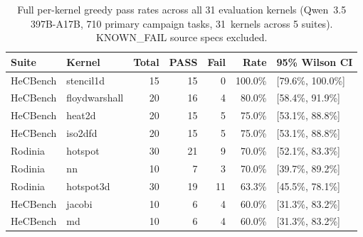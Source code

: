 \begin{table}[htbp]
\centering
\caption{Full per-kernel greedy pass rates across all 31 evaluation kernels (Qwen~3.5 397B-A17B, 710 primary campaign tasks, 31~kernels across 5 suites). KNOWN\_FAIL source specs excluded.}
\label{tab:per-kernel-full}
\footnotesize
\begin{tabular}{@{}llrrrrl@{}}
\toprule
Suite & Kernel & Total & PASS & Fail & Rate & 95\% Wilson CI \\
\midrule
HeCBench & stencil1d & 15 & 15 & 0 & 100.0\% & [79.6\%, 100.0\%] \\
HeCBench & floydwarshall & 20 & 16 & 4 & 80.0\% & [58.4\%, 91.9\%] \\
HeCBench & heat2d & 20 & 15 & 5 & 75.0\% & [53.1\%, 88.8\%] \\
HeCBench & iso2dfd & 20 & 15 & 5 & 75.0\% & [53.1\%, 88.8\%] \\
Rodinia & hotspot & 30 & 21 & 9 & 70.0\% & [52.1\%, 83.3\%] \\
Rodinia & nn & 10 & 7 & 3 & 70.0\% & [39.7\%, 89.2\%] \\
Rodinia & hotspot3d & 30 & 19 & 11 & 63.3\% & [45.5\%, 78.1\%] \\
HeCBench & jacobi & 10 & 6 & 4 & 60.0\% & [31.3\%, 83.2\%] \\
HeCBench & md & 10 & 6 & 4 & 60.0\% & [31.3\%, 83.2\%] \\

\end{tabular}
\end{table}
